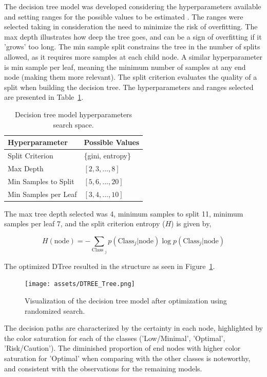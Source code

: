 \documentclass[conference]{IEEEtran}
\begin{document}
The decision tree model was developed considering the hyperparameters available and setting ranges for the possible values to be estimated \cite{dtree17}. The ranges were selected taking in consideration the need to minimize the risk of overfitting. The max depth illustrates how deep the tree goes, and can be a sign of overfitting if it 'grows' too long. The min sample split constrains the tree in the number of splits allowed, as it requires more samples at each child node. A similar hyperparameter is min sample per leaf, meaning the minimum number of samples at any end node (making them more relevant). The split criterion evaluates the quality of a split when building the decision tree. The hyperparameters and ranges selected are presented in Table~\ref{parametrosDTree}.

\begin{table}[H]
\centering
\caption{Decision tree model hyperparameters search space.}
\label{parametrosDTree}
\begin{tabular}{ll}
\toprule
\textbf{Hyperparameter} & \textbf{Possible Values} \\
\midrule
Split Criterion & \{gini, entropy\} \\ 
Max Depth & $[2, 3, \dots, 8]$ \\ 
Min Samples to Split & $[5, 6, \dots, 20]$ \\ 
Min Samples per Leaf & $[3, 4, \dots, 10]$ \\
\bottomrule
\end{tabular}
\end{table} %

The max tree depth selected was 4, minimum samples to split 11, minimum samples per leaf 7, and the split criterion entropy ($H$) is given by,

$$H(\text{node}) = - \sum_{\text{Class }_j} p(\text{Class}_j | \text{node}) \log p(\text{Class}_j | \text{node})$$

The optimized DTree resulted in the structure as seen in Figure~\ref{dtree_tree}.

\begin{figure}[H]
    \centering
    \texttt{[image: assets/DTREE\_Tree.png]}
    \caption{Visualization of the decision tree model after optimization using randomized search.}
    \label{dtree_tree}
\end{figure} %

The decision paths are characterized by the certainty in each node, highlighted by the color saturation for each of the classes ('Low/Minimal', 'Optimal', 'Risk/Caution'). The diminished proportion of end nodes with higher color saturation for 'Optimal' when comparing with the other classes is noteworthy, and consistent with the observations for the remaining models.
\end{document}
